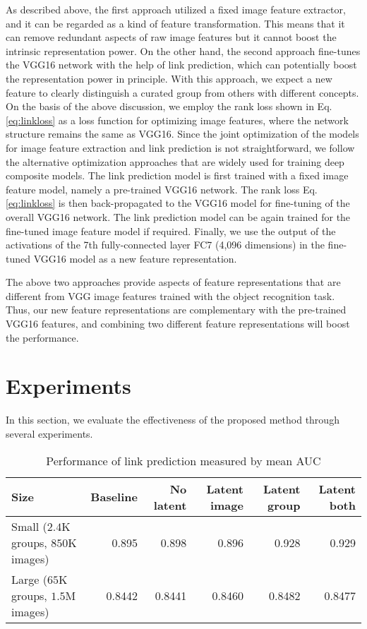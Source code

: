\documentclass[letterpaper]{article} %
\begin{document}
As described above, the first approach utilized a fixed image feature extractor, and it can be regarded as a kind of feature transformation.
%
This means that it can remove redundant aspects of raw image features but it cannot boost the intrinsic representation power.
%
On the other hand, the second approach fine-tunes the VGG16 network with the help of link prediction, which can potentially boost the representation power in principle.
%
With this approach, we expect a new feature to clearly distinguish a curated group from others with different concepts.
%
On the basis of the above discussion, we employ the rank loss shown in Eq. \eqref{eq:linkloss} as a loss function for optimizing image features, where the network structure remains the same as VGG16.
%
Since the joint optimization of the models for image feature extraction and link prediction is not straightforward, we follow the alternative optimization approaches that are widely used for training deep composite models.
%
The link prediction model is first trained with a fixed image feature model, namely a pre-trained VGG16 network.
%
The rank loss Eq. \eqref{eq:linkloss} is then back-propagated to the VGG16 model for fine-tuning of the overall VGG16 network.
%
The link prediction model can be again trained for the fine-tuned image feature model if required.
%
Finally, we use the output of the activations of the 7th fully-connected layer FC7 (4,096 dimensions) in the fine-tuned VGG16 model as a new feature representation.

The above two approaches provide aspects of feature representations that are different from VGG image features trained with the object recognition task.
%
Thus, our new feature representations are complementary with the pre-trained VGG16 features, and combining two different feature representations will boost the performance.


\section{Experiments}
\label{sec:exp}

In this section, we evaluate the effectiveness of the proposed method through several experiments.

\begin{table*}[t]
  \caption{Performance of link prediction measured by mean AUC}
  \label{table:exp_link}
  \begin{center}
    \begin{tabular}{|l|r|r|r|r|r|}\hline
      Size                                 & Baseline & No latent & Latent image & Latent group & Latent both \\ \hline
      Small ($2.4$K groups, $850$K images) & 0.895    & 0.898     & 0.896        & 0.928        & 0.929       \\ \hline
      Large ($65$K groups, $1.5$M images)  & 0.8442   & 0.8441    & 0.8460       & 0.8482       & 0.8477      \\ \hline
    \end{tabular}
  \end{center}
\end{table*}
\end{document}
